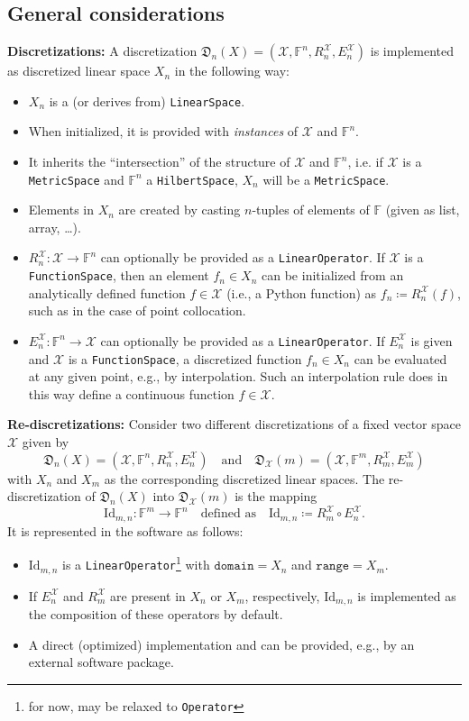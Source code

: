 \documentclass[a4paper]{paper}
\newcommand*{\SPC}[1]{{\ensuremath{\mathscr{#1}}}}
\newcommand*{\SPCX}{\SPC{X}}
\newcommand*{\FIELD}{{\ensuremath{\mathbb{F}}}}
\newcommand*{\Fn}{{\ensuremath{\FIELD^n}}}
\newcommand*{\Fm}{{\ensuremath{\FIELD^m}}}
\newcommand{\DISCOP}[1]{{\ensuremath{\mathsf{#1}}}}
\newcommand*{\DISCOPID}{\DISCOP{\mathrm{Id}}}
\newcommand*{\EXT}[2]{\ensuremath{E_{#1}^{#2}}}
\newcommand*{\REST}[2]{\ensuremath{R_{#1}^{#2}}}
\newcommand*{\RnX}{{\ensuremath{\REST{n}{\SPC{X}}}}}
\newcommand*{\RmX}{{\ensuremath{\REST{m}{\SPC{X}}}}}
\newcommand*{\EnX}{{\ensuremath{\EXT{n}{\SPC{X}}}}}
\newcommand*{\EmX}{{\ensuremath{\EXT{m}{\SPC{X}}}}}
\newcommand*{\DISCR}[2]{{\ensuremath{\mathfrak{D}_{#1}(#2)}}}
\newcommand*{\DISCRnX}{\DISCR{n}{X}}
\DeclareMathOperator{\DEFEQ}{{\coloneqq}}
\begin{document}
\subsection{General considerations}
\label{subsec:soft:general}
%
\textbf{Discretizations:}
A discretization $\DISCRnX = (\SPCX, \Fn, \RnX, \EnX)$ is implemented as discretized linear 
space $X_n$ in the following way:
%
\begin{itemize}
 \item $X_n$ is a (or derives from) \texttt{LinearSpace}.
 \item When initialized, it is provided with \emph{instances} of $\SPCX$ and $\Fn$.
 \item It inherits the ``intersection'' of the structure of $\SPCX$ and $\Fn$, i.e. if $\SPCX$ is a 
 \texttt{MetricSpace} and $\Fn$ a \texttt{HilbertSpace}, $X_n$ will be a \texttt{MetricSpace}.
 \item Elements in $X_n$ are created by casting $n$-tuples of elements of $\FIELD$ (given as list, array, \dots).
 \item $\RnX \colon \SPCX \to \Fn$ 
   can optionally be provided as a \texttt{LinearOperator}. If $\SPCX$ is a \texttt{FunctionSpace},
   then an element $f_n \in X_n$ can be initialized from an analytically defined function $f \in \SPCX$ 
   (i.e., a Python function) as $f_n \DEFEQ  \RnX(f)$, such as in the case of point collocation.
 \item $\EnX \colon \Fn \to \SPCX$ can optionally be provided as a \texttt{LinearOperator}. 
   If $\EnX$ is given and $\SPCX$ is a \texttt{FunctionSpace}, 
   a discretized function $f_n \in X_n$ can be evaluated at any given point, e.g., by interpolation. 
   Such an interpolation rule does in this way define a continuous function $f \in \SPCX$.
\end{itemize}
%
\textbf{Re-discretizations:}
Consider two different discretizations of a fixed vector space $\SPCX$ given by 
\[ \DISCRnX = (\SPCX, \Fn, \RnX, \EnX)
   \quad\text{and}\quad
  \DISCR{\SPCX}{m} =(\SPCX, \Fm, \RmX, \EmX)
\]  
with $X_n$ and $X_m$ as the corresponding discretized linear spaces.
The re-discreti\-zation of $\DISCRnX$ into $\DISCR{\SPCX}{m}$ is the mapping 
\[  \DISCOPID_{m,n} \colon \Fm \to \Fn
    \quad\text{defined as}\quad
    \DISCOPID_{m,n} \DEFEQ  \RmX \circ \EnX.
\]   
It is represented in the software as follows:
\begin{itemize}
 \item $\DISCOPID_{m,n}$ is a \texttt{LinearOperator}\footnote{for now, may be relaxed to \texttt{Operator}} with 
 $\mathtt{domain} = X_n$ and $\mathtt{range} = X_m$.
 \item If $\EnX$ and $\RmX$ are present in $X_n$ or $X_m$, respectively, $\DISCOPID_{m,n}$ is implemented as the 
 composition of these operators by default.
 \item A direct (optimized) implementation and can be provided, e.g., by an external software package.
\end{itemize}
\end{document}
